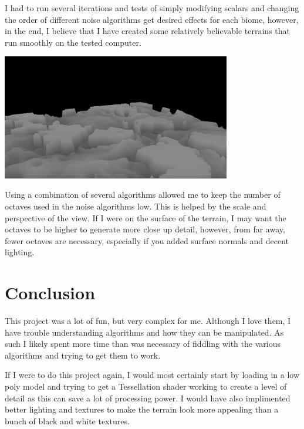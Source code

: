 \documentclass[12pt]{article}
\begin{document}
    I had to run several iterations and tests of simply modifying scalars and changing the order of different noise algorithms
    get desired effects for each biome, however, in the end, I believe that I have created some relatively believable 
    terrains that run smoothly on the tested computer.

    \vspace{1cm}
    \begin{center}
        \includegraphics[width=0.75\textwidth]{images/1.png} 
    \end{center}
    
    Using a combination of several algorithms allowed me to keep the number of octaves used in the noise algorithms low. This 
    is helped by the scale and perspective of the view. If I were on the surface of the terrain, I may want the octaves to
    be higher to generate more close up detail, however, from far away, fewer octaves are necessary, especially if you added
    surface normals and decent lighting. 

\section{Conclusion}

    This project was a lot of fun, but very complex for me. Although I love them, I have trouble understanding algorithms and
    how they can be manipulated. As such I likely spent more time than was necessary of fiddling with the various algorithms
    and trying to get them to work.

    If I were to do this project again, I would most certainly start by loading in a low poly model and trying to get a
    Tessellation shader working to create a level of detail as this can save a lot of processing power. I would have also implimented 
    better lighting and textures to make the terrain look more appealing than a bunch of black and white textures.
\end{document}
